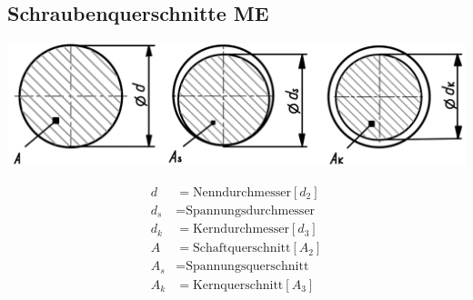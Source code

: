 \subsection{Schraubenquerschnitte \hfill ME}
\begin{footnotesize}
    \begin{minipage}{0.55\linewidth}
        \begin{center}
            \includegraphics[width = 0.9\linewidth]{src/images/MAEIP_Schraubenquerschnitte}
        \end{center}
    \end{minipage}
\end{footnotesize}
    \begin{minipage}{0.4\linewidth}
        \begin{scriptsize}
        \begin{center}
            \begin{align*}
                d &= \text{Nenndurchmesser} [d_2]
                \\d_s &= \text{Spannungsdurchmesser}
                \\d_k &= \text{Kerndurchmesser} [d_3]
                \\A &= \text{Schaftquerschnitt} [A_2]
                \\A_s &= \text{Spannungsquerschnitt}
                \\A_k &= \text{Kernquerschnitt} [A_3]
            \end{align*}
        \end{center}
    \end{scriptsize}
    \end{minipage}